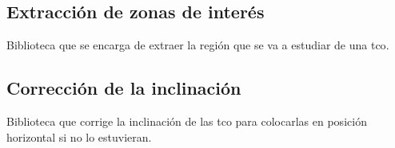 \subsection{Extracción de zonas de interés}
Biblioteca que se encarga de extraer la región que se va a estudiar de
una \gls{tco}.

\subsection{Corrección de la inclinación}
Biblioteca que corrige la inclinación de las \gls{tco} para
colocarlas en posición horizontal si no lo estuvieran.

